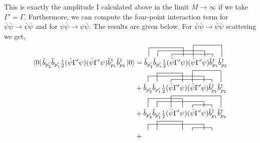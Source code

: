 \documentclass[12pt]{article}
\newcommand{\bra}[1]{\left| #1 \right>}
\newcommand{\ket}[1]{\left| #1 \right>}
\renewcommand{\bra}[1]{\left< #1 \right|}
\renewcommand{\b}{\hat{b}}
\newcommand{\bdag}{\hat{b}^\dagger}
\begin{document}
This is exactly the amplitude I calculated above in the limit $M \to \infty$ if we take $\Gamma' = \Gamma$. Furthermore, 
we can compute the four-point interaction term for $\bar{\psi} \bar{\psi} \to \bar{\psi} \bar{\psi}$ and for $\psi \bar{\psi} \to \psi \bar{\psi}$. The results are given below. For $\bar{\psi} \bar{\psi} \to \bar{\psi} \bar{\psi}$ scattering we get,
\begin{align*}
\bra{0} \b_{p_2'} \b_{p_1'} \tfrac{i}{2} ( \bar{\psi} \Gamma' \psi) (\bar{\psi} \Gamma' \psi)\bdag_{p_1} \bdag_{p_2} \ket{0} 
& =
\contraction[3ex]{}{ \b_{p_2'} }{ \b_{p_1'}\tfrac{i}{2} ( \bar{\psi} \Gamma'}{ \psi }
\contraction[2ex]{\b_{p_2'} }{ \b_{p_1'} }{ \tfrac{i}{2} ( \bar{\psi} \Gamma' \psi) ( \bar{\psi} \Gamma' }{ \psi } 
\contraction{\b_{p_2'} \b_{p_1'} \tfrac{i}{2} (}{ \bar{\psi} }{ \Gamma' \psi ) (\bar{\psi} \Gamma' \psi)}{\bdag}
\contraction[4ex]{\b_{p_2'} \b_{p_1'} \tfrac{i}{2} ( \bar{\psi} \Gamma' \psi) (}{\bar{\psi} }{ \Gamma' \psi )\bdag_{p_1}}{ \bdag}
\b_{p_2'} \b_{p_1'} \tfrac{i}{2} ( \bar{\psi} \Gamma' \psi) (\bar{\psi} \Gamma' \psi)\bdag_{p_1} \bdag_{p_2}
\\
& +  
\contraction[3ex]{ \b_{p_2'} }{ \b_{p_1'} }{\tfrac{i}{2} ( \bar{\psi} \Gamma'}{ \psi }
\contraction[2ex]{}{\b_{p_2'} }{ \b_{p_1'} \tfrac{i}{2} ( \bar{\psi} \Gamma' \psi) ( \bar{\psi} \Gamma' }{ \psi } 
\contraction{\b_{p_2'} \b_{p_1'} \tfrac{i}{2} (}{ \bar{\psi} }{ \Gamma' \psi ) (\bar{\psi} \Gamma' \psi)}{\bdag}
\contraction[4ex]{\b_{p_2'} \b_{p_1'} \tfrac{i}{2} ( \bar{\psi} \Gamma' \psi) (}{\bar{\psi} }{ \Gamma' \psi )\bdag_{p_1}}{ \bdag}
\b_{p_2'} \b_{p_1'} \tfrac{i}{2} ( \bar{\psi} \Gamma' \psi) (\bar{\psi} \Gamma' \psi)\bdag_{p_1} \bdag_{p_2}
\\
& + 
\contraction[3ex]{}{ \b_{p_2'} }{ \b_{p_1'}\tfrac{i}{2} ( \bar{\psi} \Gamma'}{ \psi }
\contraction[2ex]{\b_{p_2'} }{ \b_{p_1'} }{ \tfrac{i}{2} ( \bar{\psi} \Gamma' \psi) ( \bar{\psi} \Gamma' }{ \psi } 
\contraction{\b_{p_2'} \b_{p_1'} \tfrac{i}{2} ( \bar{\psi}  \Gamma'  \psi  ) ( }{ \bar{\psi} }{ \Gamma' \psi)}{\bdag}
\contraction[4ex]{\b_{p_2'} \b_{p_1'} \tfrac{i}{2} ( }{ \bar{\psi} }{ \Gamma' \psi) ( \bar{\psi}  \Gamma' \psi )\bdag_{p_1} }{ \bdag}
\b_{p_2'} \b_{p_1'} \tfrac{i}{2} ( \bar{\psi} \Gamma' \psi) (\bar{\psi} \Gamma' \psi)\bdag_{p_1} \bdag_{p_2}
\\
& +  
\contraction[3ex]{ \b_{p_2'} }{ \b_{p_1'} }{\tfrac{i}{2} ( \bar{\psi} \Gamma'}{ \psi }
\contraction[2ex]{}{\b_{p_2'} }{ \b_{p_1'} \tfrac{i}{2} ( \bar{\psi} \Gamma' \psi) ( \bar{\psi} \Gamma' }{ \psi } 
\contraction{\b_{p_2'} \b_{p_1'} \tfrac{i}{2} ( \bar{\psi}  \Gamma'  \psi  ) ( }{ \bar{\psi} }{ \Gamma' \psi)}{\bdag}

\end{align*}
\end{document}
